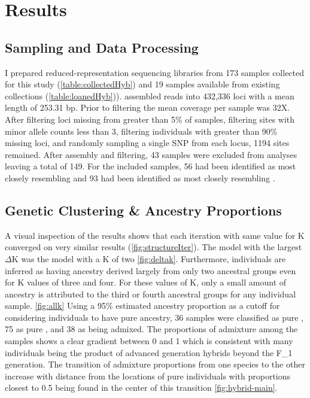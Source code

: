 \section{Results}
\subsection{Sampling and Data Processing}
I prepared reduced-representation sequencing libraries from 173 samples collected 
for this study (\cref{table:collectedHyb}) and 19 samples available from existing 
collections (\cref{table:loanedHyb})). 
\stacks assembled reads into 432,336 loci with a mean length of 253.31 bp.
Prior to filtering the mean coverage per sample was 32X.
After filtering loci missing from greater than 5\% of samples, filtering sites with   
minor allele counts less than 3, filtering individuals with greater than 90\% 
missing loci, and randomly sampling a single SNP from each locus, 1194 sites
remained.
After assembly and filtering, 43 samples were excluded from analyses leaving a total of 149. 
For the included samples, 56 had been identified as most closely resembling \amer 
and 93 had been identified as most closely resembling \terr. 

\subsection{Genetic Clustering \& Ancestry Proportions}
A visual inspection of the \structure results shows that each iteration with  
same value for K converged on very similar results (\cref{fig:structureIter}). 
The \structure model with the largest $\Delta$K was the model with a K of two \cref{fig:deltak}.
Furthermore, individuals are inferred as having ancestry derived largely 
from only two ancestral groups even for K values of three and four. For these values
of K, only a small amount of ancestry is attributed to the third or fourth 
ancestral groups for any individual sample. \cref{fig:allk} 
Using a 95\% estimated ancestry proportion as a cutoff for considering individuals to have
pure ancestry, 36 samples were classified as pure \amer, 75 as pure \terr, and  
38 as being admixed. 
The proportions of admixture among the samples shows a clear gradient between 0 
and 1 which is consistent with many individuals being the product of advanced 
generation hybrids beyond the F_1 generation.
The transition of admixture proportions from one species to the other 
increase with distance from the locations of pure individuals with proportions 
closest to 0.5 being found in the center of this transition \cref{fig:hybrid-main}.

